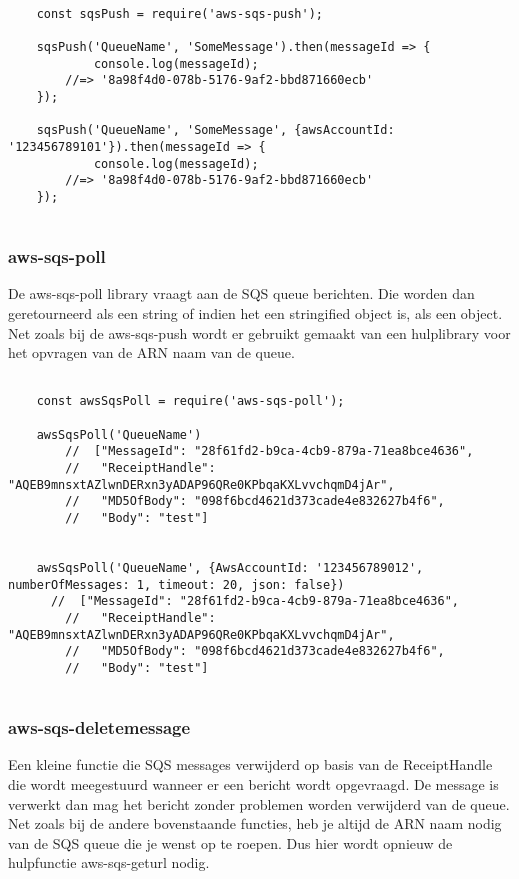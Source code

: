\begin{lstlisting}[caption=Voorbeeld dat data plaatst op een SQS queue met behulp van de aws-sqs-push library]

	const sqsPush = require('aws-sqs-push');

	sqsPush('QueueName', 'SomeMessage').then(messageId => {
    		console.log(messageId);
    	//=> '8a98f4d0-078b-5176-9af2-bbd871660ecb'
	});

	sqsPush('QueueName', 'SomeMessage', {awsAccountId: '123456789101'}).then(messageId => {
    		console.log(messageId);
    	//=> '8a98f4d0-078b-5176-9af2-bbd871660ecb'
	});
	
\end{lstlisting}
\subsubsection{aws-sqs-poll}
De aws-sqs-poll library vraagt aan de SQS queue berichten. Die worden dan geretourneerd als een string of indien het een stringified object is, als een object. Net zoals bij de aws-sqs-push wordt er gebruikt gemaakt van een hulplibrary voor het opvragen van de ARN naam van de queue.

\begin{lstlisting}[caption=Voorbeeld hoe berichten worden opgehaald van de SQS queue]

	const awsSqsPoll = require('aws-sqs-poll');

	awsSqsPoll('QueueName')
    	//  ["MessageId": "28f61fd2-b9ca-4cb9-879a-71ea8bce4636",
    	//   "ReceiptHandle": "AQEB9mnsxtAZlwnDERxn3yADAP96QRe0KPbqaKXLvvchqmD4jAr",
    	//   "MD5OfBody": "098f6bcd4621d373cade4e832627b4f6",
    	//   "Body": "test"]


	awsSqsPoll('QueueName', {AwsAccountId: '123456789012', numberOfMessages: 1, timeout: 20, json: false})
  	  //  ["MessageId": "28f61fd2-b9ca-4cb9-879a-71ea8bce4636",
    	//   "ReceiptHandle": "AQEB9mnsxtAZlwnDERxn3yADAP96QRe0KPbqaKXLvvchqmD4jAr",
    	//   "MD5OfBody": "098f6bcd4621d373cade4e832627b4f6",
    	//   "Body": "test"]
	
\end{lstlisting}
\clearpage
\subsubsection{aws-sqs-deletemessage}
Een kleine functie die SQS messages verwijderd op basis van de ReceiptHandle die wordt meegestuurd wanneer er een bericht wordt opgevraagd. De message is verwerkt dan mag het bericht zonder problemen worden verwijderd van de queue. Net zoals bij de andere bovenstaande functies, heb je altijd de ARN naam nodig van de SQS queue die je wenst op te roepen. Dus hier wordt opnieuw de hulpfunctie aws-sqs-geturl nodig.

